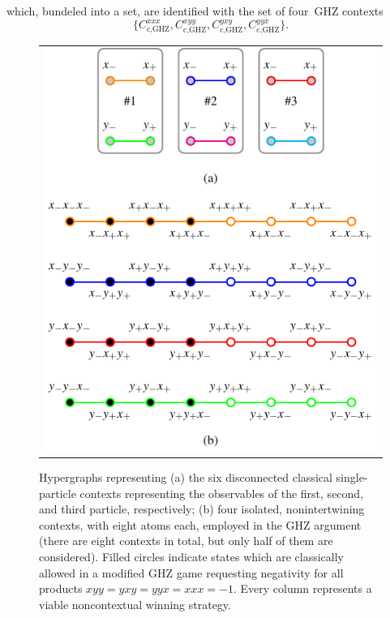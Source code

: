 \documentclass[sn-mathphys]{sn-jnl}%
\theoremstyle{thmstyleone}%
\theoremstyle{thmstyletwo}%
\theoremstyle{thmstylethree}%
\begin{document}
which, bundeled into a set, are identified with the set of four~GHZ contexts
\begin{equation}
 \Big\{
C_\textrm{c,GHZ}^{{{x}}{{x}}{{x}}}
,
C_\textrm{c,GHZ}^{{{x}}{{y}}{{y}}}
,
C_\textrm{c,GHZ}^{{{y}}{{x}}{{y}}}
,
C_\textrm{c,GHZ}^{{{y}}{{y}}{{x}}}
\Big\}
.
\label{2020-ghz-clghzc}
\end{equation}

\begin{figure}[htb]%
\begin{center}
\begin{tabular}{ c }
\includegraphics{2020-ghz-exfigures-figure0}
\end{tabular}
\end{center}
\caption{\label{2020-f-ghz-contextconf}
Hypergraphs representing
(a) the six disconnected classical single-particle contexts representing the observables of the first, second, and third particle, respectively;
(b) four isolated, nonintertwining contexts, with eight atoms each, employed in the GHZ argument
(there are eight contexts in total, but only half of them are considered).
Filled circles indicate states which are classically allowed in a modified GHZ game
requesting negativity for all products  $xyy=yxy=yyx=xxx=-1$.
Every column represents a viable noncontextual winning strategy.
}
\end{figure}
\end{document}
